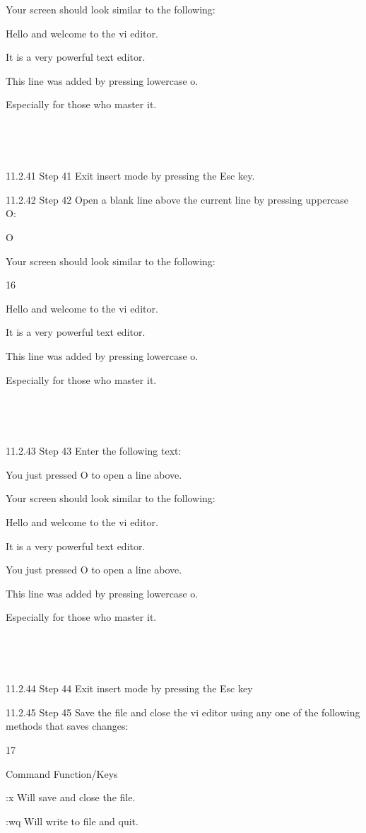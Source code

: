 Your screen should look similar to the following:

Hello and welcome to the vi editor.

It is a very powerful text editor.

This line was added by pressing lowercase o.

Especially for those who master it.

~

~

11.2.41 Step 41
Exit insert mode by pressing the Esc key.

11.2.42 Step 42
Open a blank line above the current line by pressing uppercase O:

O

Your screen should look similar to the following:

16



Hello and welcome to the vi editor.

It is a very powerful text editor.

This line was added by pressing lowercase o.

Especially for those who master it.

~

~

11.2.43 Step 43
Enter the following text:

You just pressed O to open a line above.

Your screen should look similar to the following:

Hello and welcome to the vi editor.

It is a very powerful text editor.

You just pressed O to open a line above.

This line was added by pressing lowercase o.

Especially for those who master it.

~

~

11.2.44 Step 44
Exit insert mode by pressing the Esc key

11.2.45 Step 45
Save the file and close the vi editor using any one of the following methods that saves changes:

17



Command Function/Keys

:x Will save and close the file.

:wq Will write to file and quit.

